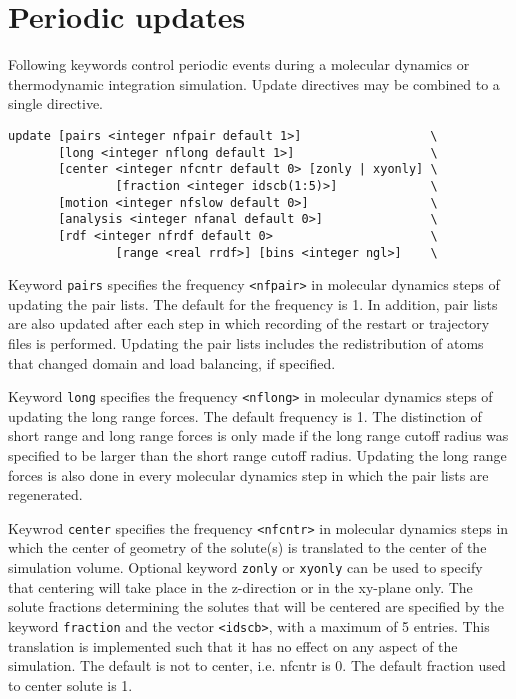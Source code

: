 \section{Periodic updates}
Following keywords control periodic events during a molecular
dynamics or thermodynamic integration simulation.
Update directives may be combined to a single directive.

\begin{description}
\item
\begin{verbatim}
update [pairs <integer nfpair default 1>]                  \
       [long <integer nflong default 1>]                   \
       [center <integer nfcntr default 0> [zonly | xyonly] \
               [fraction <integer idscb(1:5)>]             \
       [motion <integer nfslow default 0>]                 \
       [analysis <integer nfanal default 0>]               \
       [rdf <integer nfrdf default 0>                      \
               [range <real rrdf>] [bins <integer ngl>]    \
\end{verbatim}

Keyword \verb+pairs+
specifies the frequency \verb+<nfpair>+ in molecular dynamics steps of 
updating the pair lists. The default for the frequency is 1.
In addition, pair lists are also updated after each step in which
recording of the restart or trajectory files is performed. Updating
the pair lists includes the redistribution of atoms that changed
domain and load balancing, if specified.

Keyword \verb+long+
specifies the frequency \verb+<nflong>+ in molecular dynamics steps 
of updating the long range forces. The default frequency is 1.
The distinction of short range and long range forces is only
made if the long range cutoff radius was specified to be larger
than the short range cutoff radius. Updating the long range forces
is also done in every molecular dynamics step in which the
pair lists are regenerated.

Keywrod \verb+center+
specifies the frequency \verb+<nfcntr>+ in molecular dynamics steps in 
which the center of geometry of the solute(s) is translated to the
center of the simulation volume. Optional keyword \verb+zonly+ or
\verb+xyonly+ can be used to specify that centering will take place in 
the z-direction or in the xy-plane only.
The solute fractions determining the
solutes that will be centered are specified by the keyword 
{\tt fraction} and the vector \verb+<idscb>+, with a maximum of 5 entries.
This translation is implemented such that it has no effect on any 
aspect of the simulation. The default is not to center, i.e. nfcntr is
0. The default fraction used to center solute is 1.


\end{description}

